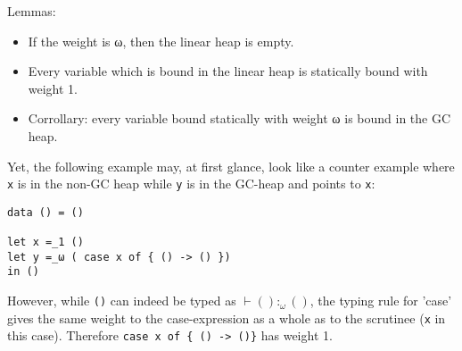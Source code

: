 \documentclass[11pt]{article}
\begin{document}
Lemmas:
\begin{itemize}
\item If the weight is ω, then the linear heap is empty.

\item Every variable which is bound in the linear heap is statically
  bound with weight 1.
\item Corrollary: every variable bound statically with weight ω is
  bound in the GC heap.
\end{itemize}















Yet, the following example may, at first glance, look like a counter
example where \verb|x| is in the non-GC heap while \verb|y| is in the
GC-heap and points to \verb|x|:
\begin{verbatim}
data () = ()

let x =_1 ()
let y =_ω ( case x of { () -> () })
in ()
\end{verbatim}
However, while \verb|()| can indeed be typed as $⊢ () :_ω ()$, the
typing rule for 'case' gives the same weight to the case-expression as
a whole as to the scrutinee (\verb|x| in this case). Therefore
\verb|case x of { () -> ()}| has weight 1.
\end{document}
